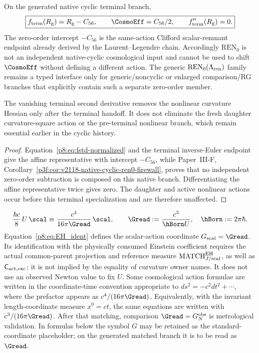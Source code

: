 \documentclass[12pt,a4paper]{article}
\begin{document}
\begin{corollary}
\label{p8:cor:v2124-native-cyclic-ren0-retirement}
On the generated native cyclic terminal branch,
\[
 \boxed{f_{\rm term}(R_{\rm g})=R_{\rm g}-C_{56},\qquad
 \CosmoEff=C_{56}/2,\qquad f_{\rm term}''(R_{\rm g})=0.}
\]
The zero-order intercept \(-C_{56}\) is the same-action Clifford
scalar-remnant endpoint already derived by the Laurent--Legendre chain.
Accordingly \(\mathrm{REN}_0\) is not an independent native-cyclic
cosmological input and cannot be used to shift \(\CosmoEff\) without defining
a different action.  The generic \(\mathrm{REN}_0(\Lambda_{\rm ren})\) family
remains a typed interface only for generic/noncyclic or enlarged comparison/RG
branches that explicitly contain such a separate zero-order member.

The vanishing terminal second derivative removes the nonlinear curvature
Hessian only after the terminal handoff.  It does not eliminate the fresh
daughter curvature-square action or the pre-terminal nonlinear branch, which
remain essential earlier in the cyclic history.
\end{corollary}
\begin{proof}
Equation~\eqref{p8:eq:fstd-normalized} and the terminal inverse-Euler endpoint
give the affine representative with intercept \(-C_{56}\), while Paper~III-F,
Corollary~\ref{p3f:cor:v2118-native-cyclic-ren0-firewall}, proves that no
independent zero-order subtraction is composed on this native branch.
Differentiating the affine representative twice gives zero.  The daughter and
active nonlinear actions occur before this terminal specialization and are
therefore unaffected.
\end{proof}

\begin{equation}
\label{p8:eq:EH_ident}
\frac{\hbar c}{8}\,U\,\scal
\equiv
\frac{c^4}{16\pi\Gread}\,\scal,
\qquad
\Gread:=\frac{c^3}{\hBorn U},\quad \hBorn:=2\pi\hbar.
\end{equation}
Equation~\eqref{p8:eq:EH_ident} defines the scalar-action coordinate
$G_{\rm scal}=\Gread$. Its identification with the physically consumed
Einstein coefficient requires the actual common-parent projection and
reference measure $\mathrm{MATCH}_{J/\mathrm{scal}}^{\rm EH}$, as well as
$\mathsf C_{\rm act,exc}$; it is not implied by the equality of curvature
owner names. It does not use an observed Newton value to fix $U$.  Some cosmological action formulae are written in
the coordinate-time convention appropriate to
\(ds^2=-c^2dt^2+\cdots\), where the prefactor appears as
\(c^4/(16\pi\Gread)\).  Equivalently, with the invariant length-coordinate
measure \(x^0=ct\), the same equations are written with
\(c^3/(16\pi\Gread)\).  After that matching, comparison \(\Gread=G_N^{\rm obs}\) is metrological
validation.  In formulas below the symbol \(G\) may be retained as the
standard-coordinate placeholder; on the generated matched branch it is to be
read as \(\Gread\).
\end{document}
